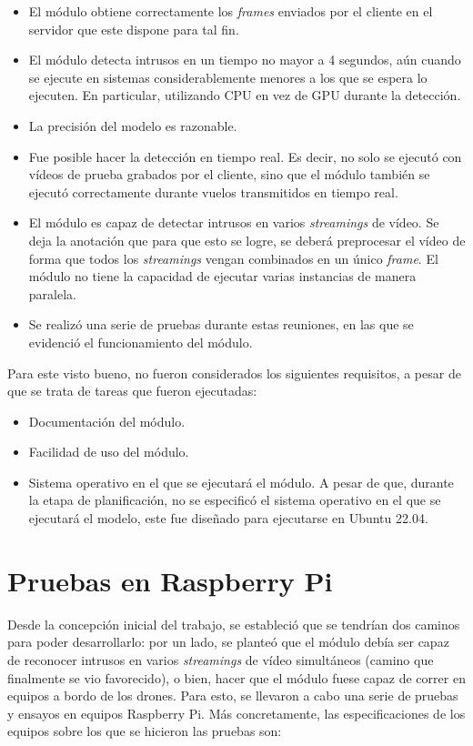 \begin{itemize}

	\item El módulo obtiene correctamente los \textit{frames} enviados por el cliente en el servidor que este dispone para tal fin.
	\item El módulo detecta intrusos en un tiempo no mayor a 4 segundos, aún cuando se ejecute en sistemas considerablemente menores a los que se espera lo ejecuten. En particular, utilizando CPU en vez de GPU durante la detección.
	\item La precisión del modelo es razonable.
	\item Fue posible hacer la detección en tiempo real. Es decir, no solo se ejecutó con vídeos de prueba grabados por el cliente, sino que el módulo también se ejecutó correctamente durante vuelos transmitidos en tiempo real.
	\item El módulo es capaz de detectar intrusos en varios \textit{streamings} de vídeo. Se deja la anotación que para que esto se logre, se deberá preprocesar el vídeo de forma que todos los \textit{streamings} vengan combinados en un único \textit{frame}. El módulo no tiene la capacidad de ejecutar varias instancias de manera paralela. 
	\item Se realizó una serie de pruebas durante estas reuniones, en las que se evidenció el funcionamiento del módulo. 

\end{itemize}

Para este visto bueno, no fueron considerados los siguientes requisitos, a pesar de que se trata de tareas que fueron ejecutadas:

\begin{itemize}
	\item Documentación del módulo.
	\item Facilidad de uso del módulo.
	\item Sistema operativo en el que se ejecutará el módulo. A pesar de que, durante la etapa de planificación, no se especificó el sistema operativo en el que se ejecutará el modelo, este fue diseñado para ejecutarse en Ubuntu 22.04. 
\end{itemize}

\section{Pruebas en Raspberry Pi}

Desde la concepción inicial del trabajo, se estableció que se tendrían dos caminos para poder desarrollarlo: por un lado, se planteó que el módulo debía ser capaz de reconocer intrusos en varios \textit{streamings} de vídeo simultáneos (camino que finalmente se vio favorecido), o bien, hacer que el módulo fuese capaz de correr en equipos a bordo de los drones. Para esto, se llevaron a cabo una serie de pruebas y ensayos en equipos Raspberry Pi. Más concretamente, las especificaciones de los equipos sobre los que se hicieron las pruebas son:

